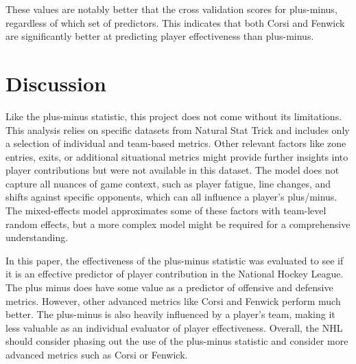 \documentclass[12pt]{article}
\begin{document}
These values are notably better that the cross validation scores for plus-minus, regardless of which set of predictors. This indicates
that both Corsi and Fenwick are significantly better at predicting player effectiveness than plus-minus.


\section{Discussion}
\label{sec:disc}

Like the plus-minus statistic, this project does not come without its limitations. This analysis relies on specific datasets from 
Natural Stat Trick and includes only a selection of individual and team-based metrics. Other relevant factors like zone entries, exits, or 
additional situational metrics might provide further insights into player contributions but were not available in this dataset. The model 
does not capture all nuances of game context, such as player fatigue, line changes, and shifts against specific opponents, which can all 
influence a player’s plus/minus. The mixed-effects model approximates some of these factors with team-level random effects, but a more 
complex model might be required for a comprehensive understanding.

In this paper, the effectiveness of the plus-minus statistic was evaluated to see if it is an effective predictor of player contribution
in the National Hockey League. The plus minus does have some value as a predictor of offensive and defensive metrics. However, other
advanced metrics like Corsi and Fenwick perform much better. The plus-minus is also heavily influenced by a player's team, making it 
less valuable as an individual evaluator of player effectiveness. Overall, the NHL should consider phasing out the use of the plus-minus
statistic and consider more advanced metrics such as Corsi or Fenwick.




\end{document}
